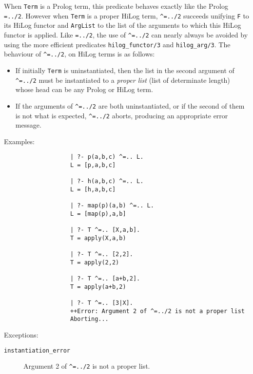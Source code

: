 \begin{description}
    When {\tt Term} is a Prolog term, this predicate behaves exactly like
    the Prolog {\tt =../2}. However when {\tt Term} is a proper HiLog term, 
    {\tt \verb|^|=../2} 
    succeeds unifying {\tt F} to its HiLog functor and {\tt ArgList} to the 
    list of the arguments to which this HiLog functor is applied. Like 
    {\tt =../2}, the use of {\tt \verb|^|=../2} can nearly always be avoided
    by using the more efficient predicates {\tt hilog\_functor/3} and 
    {\tt hilog\_arg/3}. The behaviour of {\tt \verb|^|=../2}, on HiLog terms 
    is as follows:
    \begin{itemize}
    \item If initially {\tt Term} is uninstantiated, then the list in the 
          second argument of {\tt \verb|^|=../2} must be instantiated to 
          a {\em proper list} (list of determinate length) whose head can 
          be any Prolog or HiLog term.
    \item If the arguments of {\tt \verb|^|=../2} are both uninstantiated, 
          or if the second of them is not what is expected, 
          {\tt \verb|^|=../2} aborts, producing an appropriate error message.
    \end{itemize}
    Examples:
    {\footnotesize
     \begin{verbatim}
                   | ?- p(a,b,c) ^=.. L.
                   L = [p,a,b,c]

                   | ?- h(a,b,c) ^=.. L.
                   L = [h,a,b,c]

                   | ?- map(p)(a,b) ^=.. L.
                   L = [map(p),a,b]

                   | ?- T ^=.. [X,a,b].
                   T = apply(X,a,b)

                   | ?- T ^=.. [2,2].
                   T = apply(2,2)

                   | ?- T ^=.. [a+b,2].
                   T = apply(a+b,2)

                   | ?- T ^=.. [3|X].
                   ++Error: Argument 2 of ^=../2 is not a proper list
                   Aborting...
     \end{verbatim}}

     Exceptions:
     \begin{description}
     \item[{\tt instantiation\_error}]
	Argument 2 of {\tt \verb|^|=../2} is not a proper list.
     \end{description}


\end{description}
